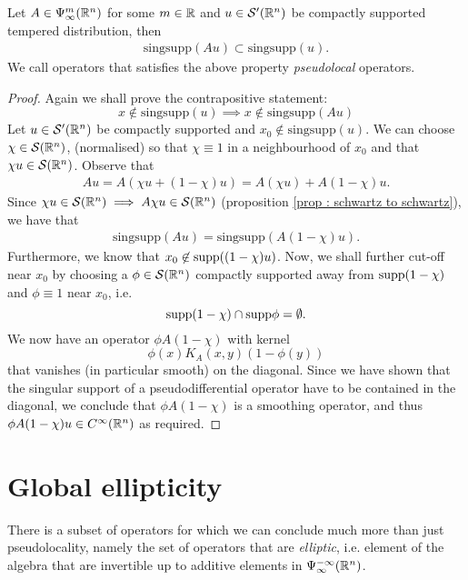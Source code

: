 \documentclass[12pt]{article}
\begin{document}
\begin{fprop}
    Let $A \in \Psi^m_\infty({\mathbb R}^n)$ for some $m \in {\ensuremath {\mathbb R}}$ and $u \in \mathcal{S}'({\mathbb R}^n)$ be compactly supported tempered distribution, then 
    \begin{align*}
        \mathrm{sing supp}(A u) \subset \mathrm{sing supp }(u). 
    \end{align*}
    We call operators that satisfies the above property \textit{pseudolocal} operators.
\end{fprop}
\begin{proof}
    Again we shall prove the contrapositive statement: 
    \[
    x \not \in \mathrm{sing supp}(u) \implies x \not \in \mathrm{sing supp}(Au)
    \]
    Let $u \in \mathcal{S}'({\mathbb R}^n)$ be compactly supported and $x_0 \not \in \mathrm{sing supp}(u)$.  We can choose $\chi \in \mathcal{S}({\mathbb R}^n)$, (normalised) so that $\chi \equiv 1$ in a neighbourhood of $x_0$ and that $\chi u \in \mathcal{S}({\mathbb R}^n)$. Observe that 
    \begin{align*}
        Au = A(\chi u + (1 - \chi)u) = A(\chi u) + A(1 - \chi)u. 
    \end{align*}
    Since $\chi u \in \mathcal{S}({\mathbb R}^n) \implies A\chi u \in \mathcal{S}({\mathbb R}^n)$ (proposition \ref{prop : schwartz to schwartz}), we have that 
    \begin{align*}
        \mathrm{singsupp}(Au) = \mathrm{singsupp}(A(1 - \chi)u). 
    \end{align*}
    Furthermore, we know that $x_0 \not \in \mathrm{supp}((1 - \chi)u)$. 
    Now, we shall further cut-off near $x_0$ by choosing a $\phi \in \mathcal{S}({\mathbb R}^n)$ compactly supported  away from $\mathrm{supp}(1 - \chi)$ and $\phi \equiv 1$ near $x_0$, i.e. 
    \[
    \mathrm{supp}(1 - \chi) \cap \mathrm{supp} \phi = \emptyset. 
    \]
    We now have an operator $\phi A(1 - \chi) $ with kernel
    \[
    \phi(x) K_A(x, y) ( 1 - \phi(y))
    \]
    that vanishes (in particular smooth) on the diagonal. Since we have shown that the singular support of a pseudodifferential operator have to be contained in the diagonal, we conclude that $\phi A(1 - \chi)$ is a smoothing operator, and thus $\phi A (1 - \chi) u \in C^\infty({\mathbb R}^n)$ as required. 
    
\end{proof}


\section{Global ellipticity} 
There is a subset of operators for which we can conclude much more than just pseudolocality, namely the set of operators that are \textit{elliptic}, i.e. element of the algebra that are invertible up to additive elements in $\Psi^{-\infty}_{\infty}({\mathbb R}^n)$. 
\end{document}
